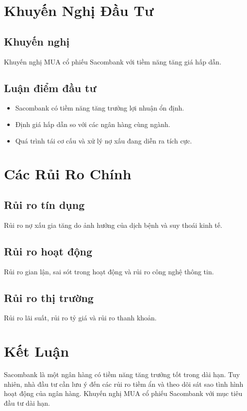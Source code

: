 \documentclass[11pt]{article}
\begin{document}
\section{Khuyến Nghị Đầu Tư}

\subsection{Khuyến nghị}
Khuyến nghị MUA cổ phiếu Sacombank với tiềm năng tăng giá hấp dẫn.

\subsection{Luận điểm đầu tư}
\begin{itemize}
    \item Sacombank có tiềm năng tăng trưởng lợi nhuận ổn định.
    \item Định giá hấp dẫn so với các ngân hàng cùng ngành.
    \item Quá trình tái cơ cấu và xử lý nợ xấu đang diễn ra tích cực.
\end{itemize}

\section{Các Rủi Ro Chính}

\subsection{Rủi ro tín dụng}
Rủi ro nợ xấu gia tăng do ảnh hưởng của dịch bệnh và suy thoái kinh tế.

\subsection{Rủi ro hoạt động}
Rủi ro gian lận, sai sót trong hoạt động và rủi ro công nghệ thông tin.

\subsection{Rủi ro thị trường}
Rủi ro lãi suất, rủi ro tỷ giá và rủi ro thanh khoản.

\section{Kết Luận}

Sacombank là một ngân hàng có tiềm năng tăng trưởng tốt trong dài hạn. Tuy nhiên, nhà đầu tư cần lưu ý đến các rủi ro tiềm ẩn và theo dõi sát sao tình hình hoạt động của ngân hàng. Khuyến nghị MUA cổ phiếu Sacombank với mục tiêu đầu tư dài hạn.
\end{document}
